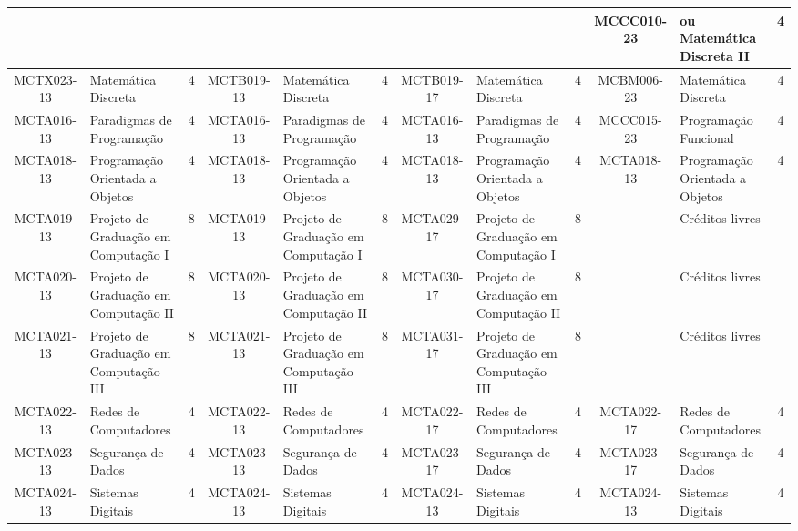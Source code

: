 \documentclass[a4paper]{article}
\begin{document}
\begin{landscape}
{\begin{longtable}{|c|p{.2\textheight}|c||c|p{.2\textheight}|c||c|p{.2\textheight}|c||c|p{.2\textheight}|c|}
    & & &
    & & &
    & & &
    MCCC010-23 & ou Matemática Discreta II & 4 \\ \hline

    MCTX023-13 & Matemática Discreta & 4 & 
    MCTB019-13 & Matemática Discreta & 4 &
    MCTB019-17 & Matemática Discreta & 4 &
    MCBM006-23 & Matemática Discreta & 4 \\ \hline

    MCTA016-13 & Paradigmas de Programação & 4 &
    MCTA016-13 & Paradigmas de Programação & 4 & 
    MCTA016-13 & Paradigmas de Programação & 4 &
    MCCC015-23 & Programação Funcional & 4 \\ \hline

    MCTA018-13 & Programação Orientada a Objetos & 4 &
    MCTA018-13 & Programação Orientada a Objetos & 4 & 
    MCTA018-13 & Programação Orientada a Objetos & 4 &
    MCTA018-13 & Programação Orientada a Objetos & 4 \\ \hline

    MCTA019-13 & Projeto de Graduação em Computação I & 8 &
    MCTA019-13 & Projeto de Graduação em Computação I & 8 &
    MCTA029-17 & Projeto de Graduação em Computação I & 8 &
               & Créditos livres &  \\ \hline

    MCTA020-13 & Projeto de Graduação em Computação II & 8 &
    MCTA020-13 & Projeto de Graduação em Computação II & 8 &
    MCTA030-17 & Projeto de Graduação em Computação II & 8 & 
               & Créditos livres &  \\ \hline

    MCTA021-13 & Projeto de Graduação em Computação III & 8 &
    MCTA021-13 & Projeto de Graduação em Computação III & 8 & 
    MCTA031-17 & Projeto de Graduação em Computação III & 8 &
               & Créditos livres &  \\ \hline

    MCTA022-13 & Redes de Computadores & 4 & 
    MCTA022-13 & Redes de Computadores & 4 &
    MCTA022-17 & Redes de Computadores & 4 & 
    MCTA022-17 & Redes de Computadores & 4 \\ \hline

    MCTA023-13 & Segurança de Dados & 4 & 
    MCTA023-13 & Segurança de Dados & 4 & 
    MCTA023-17 & Segurança de Dados & 4 & 
    MCTA023-17 & Segurança de Dados & 4 \\ \hline

    MCTA024-13 & Sistemas Digitais & 4 &
    MCTA024-13 & Sistemas Digitais & 4 &
    MCTA024-13 & Sistemas Digitais & 4 &
    MCTA024-13 & Sistemas Digitais & 4 \\ \hline


\end{longtable}}
\end{landscape}
\end{document}
